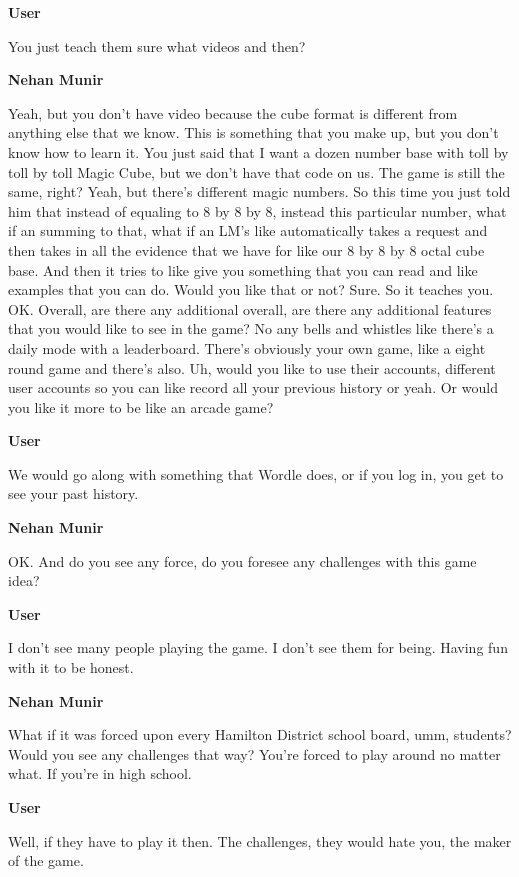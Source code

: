 \documentclass{article}
\begin{document}
\noindent \textbf{User}

You just teach them sure what videos and then?

\noindent \textbf{Nehan Munir}

Yeah, but you don't have video because the cube format is different from anything else that we know. This is something that you make up, but you don't know how to learn it. You just said that I want a dozen number base with toll by toll by toll Magic Cube, but we don't have that code on us. The game is still the same, right? Yeah, but there's different magic numbers. So this time you just told him that instead of equaling to 8 by 8 by 8, instead this particular number, what if an summing to that, what if an LM's like automatically takes a request and then takes in all the evidence that we have for like our 8 by 8 by 8 octal cube base. And then it tries to like give you something that you can read and like examples that you can do. Would you like that or not? Sure. So it teaches you. OK. Overall, are there any additional overall, are there any additional features that you would like to see in the game? No any bells and whistles like there's a daily mode with a leaderboard. There's obviously your own game, like a eight round game and there's also. Uh, would you like to use their accounts, different user accounts so you can like record all your previous history or yeah. Or would you like it more to be like an arcade game?

\noindent \textbf{User}

We would go along with something that Wordle does, or if you log in, you get to see your past history.

\noindent \textbf{Nehan Munir}

OK. And do you see any force, do you foresee any challenges with this game idea?

\noindent \textbf{User}

I don't see many people playing the game. I don't see them for being. Having fun with it to be honest.

\noindent \textbf{Nehan Munir}

What if it was forced upon every Hamilton District school board, umm, students? Would you see any challenges that way? You're forced to play around no matter what. If you're in high school.

\noindent \textbf{User}

Well, if they have to play it then. The challenges, they would hate you, the maker of the game.
\end{document}
